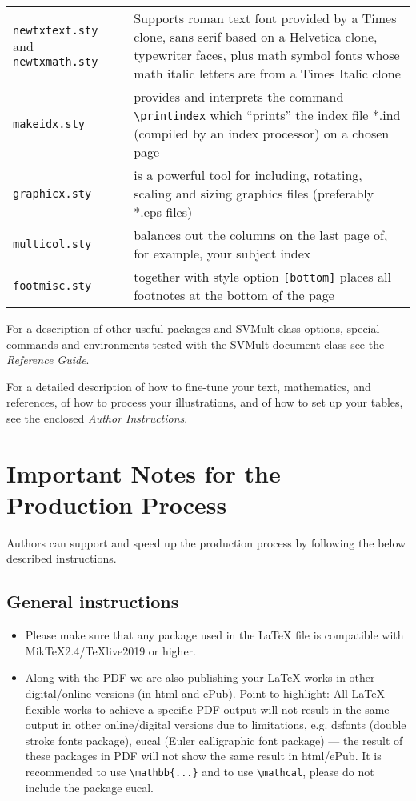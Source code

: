 \documentclass[graybox]{svmult}
\begin{document}
\begin{refguide}
\begin{sloppy}
\begin{tabular}{p{7.5pc}@{\qquad}p{18.5pc}}
{\tt newtxtext.sty} and {\tt newtxmath.sty} & Supports roman text font provided by a Times clone,  sans serif based on a Helvetica clone,  typewriter faces,  plus math symbol fonts whose math italic letters are from a Times Italic clone\\
{\tt makeidx.sty} &  provides  and interprets the command  \verb|\printindex|  which ``prints'' the index file *.ind (compiled by an index processor) on a chosen page\\
{\tt graphicx.sty} & is a powerful tool for including, rotating, scaling and sizing graphics files (preferably *.eps files)\\
{\tt multicol.sty} & balances out the columns on the last page of, for example, your subject index\\
{\tt footmisc.sty}  & together with style option {\tt [bottom]} places all footnotes at the bottom of the page
\end{tabular}

For a description of other useful packages and {\sc SVMult} class options, special commands and environments tested with the {\sc SVMult} document class see the {\it Reference Guide}.



For a detailed description of how to fine-tune your text, mathematics, and references, of how to process your illustrations, and of how to set up your tables, see the enclosed {\it Author Instructions}.

\section{Important Notes for the Production Process}

Authors can support and speed up the production process by following the below described instructions.

\subsection*{General instructions}

\begin{itemize}
\item Please make sure that any package used in the LaTeX file is compatible with MikTeX2.4/TeXlive2019 or higher.

\item Along with the PDF we are also publishing your LaTeX works in other digital/online versions (in html and ePub). Point to highlight: All LaTeX flexible works to achieve a specific PDF output will not result in the same output in other online/digital versions due to limitations, e.g. dsfonts (double stroke fonts package), eucal (Euler calligraphic font package) --- the result of these packages in PDF will not show the same result in html/ePub. It is recommended to use \verb|\mathbb{...}| and to use \verb|\mathcal|, please do not include the package eucal.


\end{itemize}
\end{sloppy}
\end{refguide}
\end{document}
